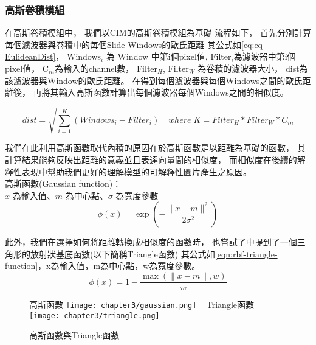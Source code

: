 \documentclass[class=NCU_thesis, crop=false]{standalone}
\begin{document}
		\subsubsection{高斯卷積模組}
			在高斯卷積模組中，
			我們以CIM的高斯卷積模組為基礎
			流程如下，
			首先分別計算每個濾波器與卷積中的每個Slide Windows的歐氏距離
			其公式如\cref{eq:eq-EulideanDist}，
			Windows$_{i}$ 為 Window 中第i個pixel值, 
			Filter$_{i}$為濾波器中第i個pixel值，
			C$_{in}$為輸入的channel數，
			Filter$_{H}$, Filter$_{W}$ 為卷積的濾波器大小，
			dist為該濾波器與Window的歐氏距離。
			在得到每個濾波器與每個Windows之間的歐氏距離後，
			再將其輸入高斯函數計算出每個濾波器每個Windows之間的相似度。

			\begin{equation}
			    \label{eq:eq-EulideanDist}
			    dist = \sqrt{\sum_{i = 1}^{K} (Windows_{i} - Filter_{i})} \quad where \; K = Filter_{H} * Filter_{W} * C_{in}
			\end{equation}

				我們在此利用高斯函數取代內積的原因在於高斯函數是以距離為基礎的函數，
			其計算結果能夠反映出距離的意義並且表達向量間的相似度，
			而相似度在後續的解釋性表現中幫助我們更好的理解模型的可解釋性圖片產生之原因。\\
			高斯函數(Gaussian function)：\\
			  $x$ 為輸入值、$m$ 為中心點、$\sigma$ 為寬度參數
			  \begin{equation}
			      \label{eqn:rbf-gaussian-function}
			      \phi (x) = \exp \left( -\frac{\| x-m \|^2}{2\sigma ^2} \right) 
			  \end{equation}

		  	此外，我們在選擇如何將距離轉換成相似度的函數時，
		  	也嘗試了\cite{YangCNNInterpretable}中提到了一個三角形的放射狀基底函數(以下簡稱Triangle函數)
		  	其公式如\cref{eqn:rbf-triangle-function}，x為輸入值，m為中心點，w為寬度參數。
		  	\begin{equation}
		      \label{eqn:rbf-triangle-function}
		      \phi (x) = 1 - \frac{ \max \left( \| x-m \|, w \right)}{w}
		  	\end{equation}

		  	\begin{figure}[H]
		    \centering
		    \subcaptionbox
		        {高斯函數
		        \label{fig:gaussian}}
		        {\texttt{[image: chapter3/gaussian.png]}}
		    ~
		    \subcaptionbox
		        {Triangle函數
		        \label{fig:triangle}}
		        {\texttt{[image: chapter3/triangle.png]}}
		    \caption{高斯函數與Triangle函數\cite{YangCNNInterpretable}}
		    \label{fig:rbf}
			\end{figure}
\end{document}
